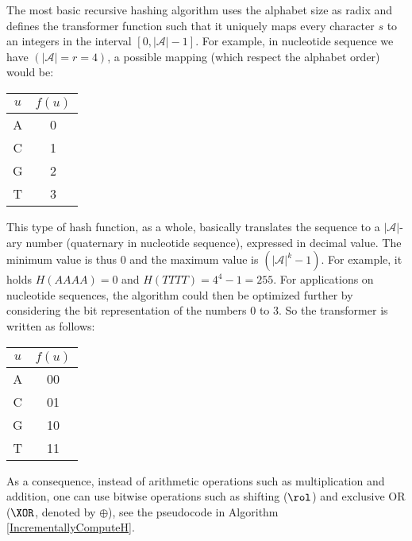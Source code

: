 The most basic recursive hashing algorithm uses the alphabet size as
radix and defines the transformer function such that it uniquely
maps every character $s$ to an integers in the interval
$[0,|\mathcal{A}|-1]$. For example, in nucleotide sequence we have
$(|\mathcal{A}|=r=4)$,
a possible mapping (which respect the alphabet order) would be:
\begin{center}
\begin{tabular}{c|c}
$u$ & $f(u)$\\
\hline
A & 0 \\
C & 1 \\
G & 2\\
T & 3
\end{tabular}
\end{center}
This type of hash function, as a whole, basically translates the sequence
to a $|\mathcal{A}|$-ary number (quaternary in nucleotide sequence),
expressed in
decimal value. The minimum value is thus 0 and the maximum value is
$(|\mathcal{A}|^k-1)$. For example, it holds $H(AAAA) = 0$ and
$H(TTTT) = 4^4-1 = 255$.
For applications on nucleotide sequences,
the algorithm could then be optimized further by considering the bit
representation of the numbers 0 to 3. So the transformer is written as
follows:
\begin{center}
\begin{tabular}{c|c}
$u$ & $f(u)$ \\
\hline
A & 00\\
C & 01\\
G & 10\\
T & 11
\end{tabular}
\end{center}
As a consequence, instead of
arithmetic operations such as multiplication and addition, one can
use bitwise operations such as shifting ($\rol$) and exclusive OR (\(\XOR\),
denoted by
$\oplus$), see the pseudocode in Algorithm \ref{IncrementallyComputeH}.

